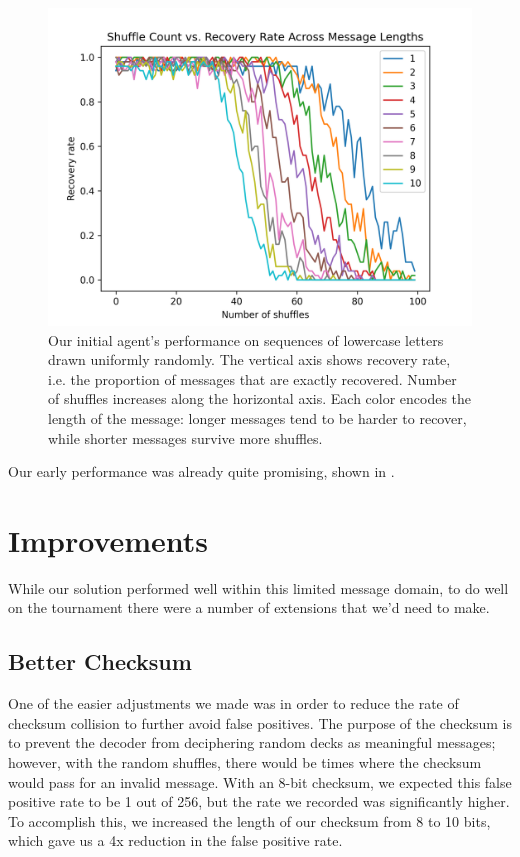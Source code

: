 \documentclass[titlepage]{article}
\begin{document}
\begin{figure}
    \centering
    \includegraphics[width=\textwidth]{figures/early_agent.png}
    \caption{Our initial agent's performance on sequences of lowercase letters drawn uniformly randomly. The vertical axis shows recovery rate, i.e. the proportion of messages that are exactly recovered. Number of shuffles increases along the horizontal axis. Each color encodes the length of the message: longer messages tend to be harder to recover, while shorter messages survive more shuffles.}
    \label{fig:early_agent}
\end{figure}

Our early performance was already quite promising, shown in .

\FloatBarrier

\section{Improvements}

While our solution performed well within this limited message domain, to do well on the tournament there were a number of extensions that we'd need to make. 

\subsection{Better Checksum}
One of the easier adjustments we made was in order to reduce the rate of checksum collision to further avoid false positives. The purpose of the checksum is to prevent the decoder from deciphering random decks as meaningful messages; however, with the random shuffles, there would be times where the checksum would pass for an invalid message. With an 8-bit checksum, we expected this false positive rate to be 1 out of 256, but the rate we recorded was significantly higher. To accomplish this, we increased the length of our checksum from 8 to 10 bits, which gave us a 4x reduction in the false positive rate.
\end{document}
